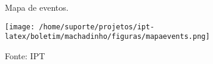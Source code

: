 
\begin{figure}[h]
    \centering
	\captionsetup{justification=raggedright, singlelinecheck=false, width=1\textwidth}
    \caption{Mapa de eventos.}
    \texttt{[image: /home/suporte/projetos/ipt-latex/boletim/machadinho/figuras/mapaevents.png]}
    \caption*{Fonte: IPT}
\end{figure}
